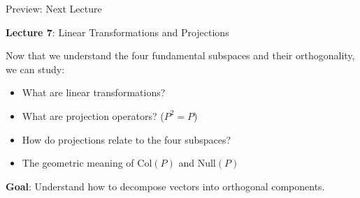 \documentclass[10pt]{beamer}
\theoremstyle{definition}
\newcommand{\x}[1]{\alert{\textbf{#1}}}
\begin{document}
\begin{frame}{Preview: Next Lecture}

\x{Lecture 7}: Linear Transformations and Projections

\vspace{1em}

Now that we understand the four fundamental subspaces and their orthogonality, we can study:

\begin{itemize}
\item What are linear transformations?
\item What are projection operators? ($P^2 = P$)
\item How do projections relate to the four subspaces?
\item The geometric meaning of Col$(P)$ and Null$(P)$
\end{itemize}

\vspace{1em}

\x{Goal}: Understand how to decompose vectors into orthogonal components.

\end{frame}
\end{document}
